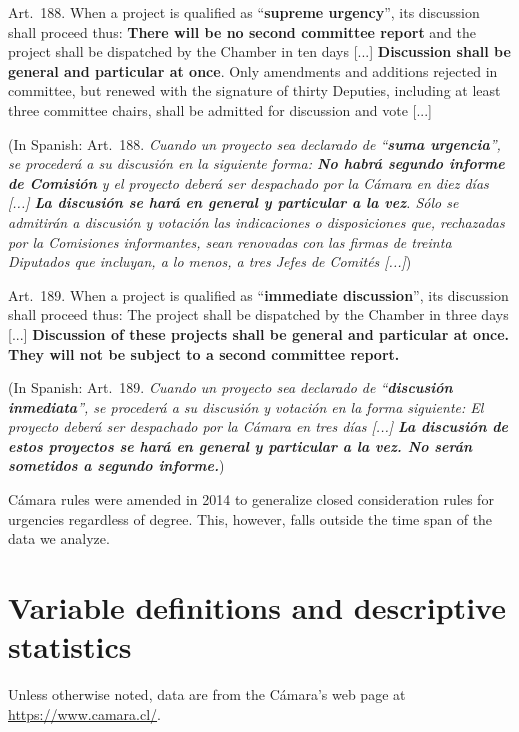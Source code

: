 \documentclass[letter,12pt]{article}
\begin{document}
\singlespacing

Art.~188. When a project is qualified as ``\textbf{supreme urgency}'', its discussion shall proceed thus: \textbf{There will be no second committee report} and the project shall be dispatched by the Chamber in ten days [...] \textbf{Discussion shall be general and particular at once}. Only amendments and additions rejected in committee, but renewed with the signature of thirty Deputies, including at least three committee chairs, shall be admitted for discussion and vote [...]

(In Spanish: Art.~188. \emph{Cuando un proyecto sea declarado de ``\textbf{suma urgencia}'', se procederá a su discusión en la siguiente forma: \textbf{No habrá segundo informe de Comisión} y el proyecto deberá ser despachado por la Cámara en diez días [...]
\textbf{La discusión se hará en general y particular a la vez}. Sólo se admitirán a discusión y votación las indicaciones o disposiciones que, rechazadas por la Comisiones informantes, sean renovadas con las firmas de treinta Diputados que incluyan, a lo menos, a tres Jefes de Comités [...]})

\bigskip

Art.~189. When a project is qualified as ``\textbf{immediate discussion}'', its discussion shall proceed thus: The project shall be dispatched by the Chamber in three days [...]
\textbf{Discussion of these projects shall be general and particular at once. They will not be subject to a second committee report.}

(In Spanish: Art.~189. \emph{Cuando un proyecto sea declarado de ``\textbf{discusión inmediata}'', se procederá a su discusión y votación en la forma siguiente:
El proyecto deberá ser despachado por la Cámara en tres días [...]
\textbf{La discusión de estos proyectos se hará en general y particular a la vez. No serán sometidos a segundo informe.}})

\doublespacing

Cámara rules were amended in 2014 to generalize closed consideration rules for urgencies regardless of degree. This, however, falls outside the time span of the data we analyze.


\section{Variable definitions and descriptive statistics}

Unless otherwise noted, data are from the Cámara's web page at \url{https://www.camara.cl/}.
\end{document}
